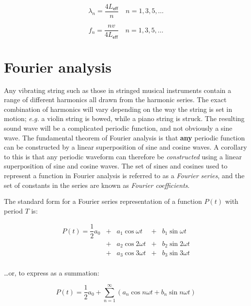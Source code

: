 \documentclass[
]{book}
\begin{document}
\begin{equation}
\lambda_n = \frac{4 L_\textsf{eff}}{n} \quad n = 1,3,5,\dots
\end{equation}

\begin{equation}
f_n = \frac{nv}{4 L_\textsf{eff}} \quad n = 1,3,5,\dots
\end{equation}

\hypertarget{sec-ch11-fourieranalysis}{%
\chapter{Fourier analysis}\label{sec-ch11-fourieranalysis}}

Any vibrating string such as those in stringed musical instruments contain a range of different harmonics all drawn from the harmonic series. The exact combination of harmonics will vary depending on the way the string is set in motion; \emph{e.g.} a violin string is bowed, while a piano string is struck. The resulting sound wave will be a complicated periodic function, and not obviously a sine wave. The fundamental theorem of Fourier analysis is that \textbf{any} periodic function can be constructed by a linear superposition of sine and cosine waves. A corollary to this is that any periodic waveform can therefore be \emph{constructed} using a linear superposition of sine and cosine waves. The set of sines and cosines used to represent a function in Fourier analysis is referred to as a \emph{Fourier series}, and the set of constants in the series are known as \emph{Fourier coefficients}.

The standard form for a Fourier series representation of a function \(P(t)\) with period \(T\) is:

\begin{equation}
\begin{array}{rclcl}
P(t) = \dfrac{1}{2}a_0 & +& a_1 \cos \omega t &+& b_1 \sin \omega t \\
                      & + &a_2 \cos 2\omega t &+& b_2 \sin 2\omega t \\
                      & +& a_3 \cos 3\omega t &+& b_3 \sin 3\omega t \\
\end{array}
\end{equation}

\ldots or, to express as a summation:

\begin{equation}
P(t) = \frac{1}{2}a_{0} + \sum_{n=1}^{\infty}\left(a_{n}\cos n\omega t + b_{n}\sin n\omega t\right)
\end{equation}
\end{document}
